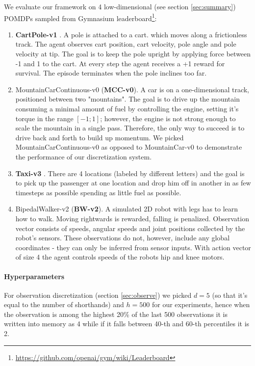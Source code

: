 We evaluate our framework on 4 low-dimensional (see section \ref{sec:summary}) POMDPs sampled from Gymnasium \cite{towersGymnasiumStandardInterface2024} leaderboard\footnote{\url{https://github.com/openai/gym/wiki/Leaderboard}}:

\begin{enumerate}
\item \textbf{CartPole-v1} \cite{cartpole}.
A pole is attached to a cart.  which moves along a frictionless track.
The agent observes cart position, cart velocity, pole angle and pole velocity at tip.
The goal is to keep the pole upright by applying force between -1 and 1 to the cart.
At every step the agent receives a +1 reward for survival.
The episode terminates when the pole inclines too far.
\item MountainCarContinuous-v0 (\textbf{MCC-v0})\cite{mountain_car}.
A car is on a one-dimensional track, positioned between two "mountains". 
The goal is to drive up the mountain consuming a minimal amount of fuel by controlling the engine, setting it's torque in the range $[-1;1]$; however, the engine is not strong enough to scale the mountain in a single pass.
Therefore, the only way to succeed is to drive back and forth to build up momentum. 
We picked MountainCarContinuous-v0 as opposed to MountainCar-v0 to demonstrate the performance of our discretization system.
\item \textbf{Taxi-v3} \cite{taxi}. There are 4 locations (labeled by different letters) and the goal is to pick up the passenger at one location and drop him off in another in as few timesteps as possible spending as little fuel as possible.
\item BipedalWalker-v2 (\textbf{BW-v2}). A simulated 2D robot with legs has to learn how to walk. 
Moving rightwards is rewarded, falling is penalized.
Observation vector consists of speeds, angular speeds and joint positions collected by the robot's sensors.
These observations do not, however, include any global coordinates - they can only be inferred from sensor inputs.
With action vector of size 4 the agent controls speeds of the robots hip and knee motors.
\end{enumerate}

\paragraph{Hyperparameters}

For observation discretization (section \ref{sec:observe}) we picked $d=5$ (so that it's equal to the number of shorthands) and $h=500$ for our experiments, hence when the observation is among the highest 20\% of the last 500 observations it is written into memory as 4 while if it falls between 40-th and 60-th percentiles it is 2.

